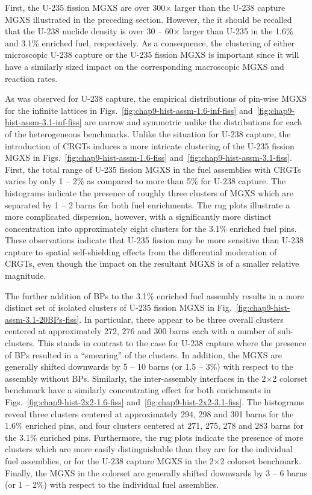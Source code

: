 First, the U-235 fission \ac{MGXS} are over 300$\times$ larger than the U-238 capture \ac{MGXS} illustrated in the preceding section. However, the it should be recalled that the U-238 nuclide density is over 30 -- 60$\times$ larger than U-235 in the 1.6\% and 3.1\% enriched fuel, respectively. As a consequence, the clustering of either microscopic U-238 capture or the U-235 fission \ac{MGXS} is important since it will have a similarly sized impact on the corresponding macroscopic \ac{MGXS} and reaction rates.

As was observed for U-238 capture, the empirical distributions of pin-wise \ac{MGXS} for the infinite lattices in Figs.~\ref{fig:chap9-hist-assm-1.6-inf-fiss} and~\ref{fig:chap9-hist-assm-3.1-inf-fiss} are narrow and symmetric unlike the distributions for each of the heterogeneous benchmarks. Unlike the situation for U-238 capture, the introduction of \acp{CRGT} induces a more intricate clustering of the U-235 fission \ac{MGXS} in Figs.~\ref{fig:chap9-hist-assm-1.6-fiss} and~\ref{fig:chap9-hist-assm-3.1-fiss}. First, the total range of U-235 fission \ac{MGXS} in the fuel assemblies with \acp{CRGT} varies by only 1 -- 2\% as compared to more than 5\% for U-238 capture. The histograms indicate the presence of roughly three clusters of \ac{MGXS} which are separated by 1 -- 2 barns for both fuel enrichments. The rug plots illustrate a more complicated dispersion, however, with a significantly more distinct concentration into approximately eight clusters for the 3.1\% enriched fuel pins. These observations indicate that U-235 fission may be more sensitive than U-238 capture to spatial self-shielding effects from the differential moderation of \acp{CRGT}, even though the impact on the resultant \ac{MGXS} is of a smaller relative magnitude. 

The further addition of \acp{BP} to the 3.1\% enriched fuel assembly results in a more distinct set of isolated clusters of U-235 fission \ac{MGXS} in Fig.~\ref{fig:chap9-hist-assm-3.1-20BPs-fiss}. In particular, there appear to be three overall clusters centered at approximately 272, 276 and 300 barns each with a number of sub-clusters. This stands in contrast to the case for U-238 capture where the presence of \acp{BP} resulted in a ``smearing'' of the clusters. In addition, the \ac{MGXS} are generally shifted downwards by 5 -- 10  barns (or 1.5 -- 3\%) with respect to the assembly without \acp{BP}. Similarly, the inter-assembly interfaces in the 2$\times$2 colorset benchmark have a similarly concentrating effect for both enrichments in Figs.~\ref{fig:chap9-hist-2x2-1.6-fiss} and~\ref{fig:chap9-hist-2x2-3.1-fiss}. The histograms reveal three clusters centered at approximately 294, 298 and 301 barns for the 1.6\% enriched pins, and four clusters centered at 271, 275, 278 and 283 barns for the 3.1\% enriched pins. Furthermore, the rug plots indicate the presence of more clusters which are more easily distinguishable than they are for the individual fuel assemblies, or for the U-238 capture \ac{MGXS} in the 2$\times$2 colorset benchmark. Finally, the \ac{MGXS} in the colorset are generally shifted downwards by 3 -- 6  barns (or 1 -- 2\%) with respect to the individual fuel assemblies.

